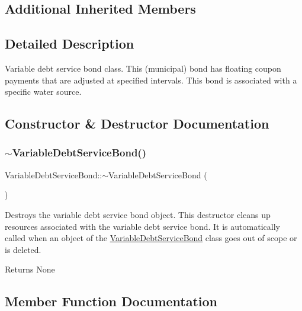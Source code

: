 \subsection*{Additional Inherited Members}


\subsection{Detailed Description}
Variable debt service bond class. This (municipal) bond has floating coupon payments that are adjusted at specified intervals. This bond is associated with a specific water source. 

\subsection{Constructor \& Destructor Documentation}
\mbox{\label{classVariableDebtServiceBond_a8259b64265dd9701ac5888e0fe0bc565}} 
\subsubsection{\texorpdfstring{$\sim$\+Variable\+Debt\+Service\+Bond()}{~VariableDebtServiceBond()}}
{\footnotesize\ttfamily Variable\+Debt\+Service\+Bond\+::$\sim$\+Variable\+Debt\+Service\+Bond (\begin{DoxyParamCaption}{ }\end{DoxyParamCaption})\hspace{0.3cm}{\ttfamily [override]}}



Destroys the variable debt service bond object. This destructor cleans up resources associated with the variable debt service bond. It is automatically called when an object of the {\ttfamily \mbox{\hyperlink{classVariableDebtServiceBond}{Variable\+Debt\+Service\+Bond}}} class goes out of scope or is deleted. 

\begin{DoxyReturn}{Returns}
None 
\end{DoxyReturn}


\subsection{Member Function Documentation}
\mbox{\label{classVariableDebtServiceBond_a575a9a41df38e005ba0a1cff3eb2b921}} 

